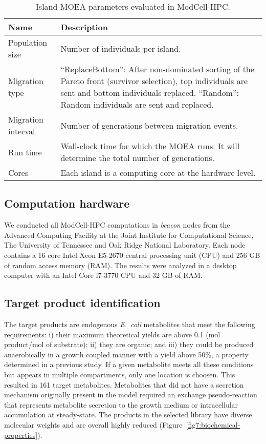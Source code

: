{\begin{table}[h]
    \caption{Island-MOEA parameters evaluated in ModCell-HPC.}
    \centering
    \begin{tabular}{lp{13cm}}
        \toprule
        Name                & Description   \\
        \midrule
        Population size     & Number of individuals per island.  \\
        Migration type      & ``ReplaceBottom'': After non-dominated sorting of the Pareto front\citep{deb2002} (survivor selection), top individuals are sent and bottom individuals replaced. ``Random'': Random individuals are sent and replaced.  \\
        Migration interval  & Number of generations between migration events.    \\
        Run time            & Wall-clock time for which the MOEA runs. It will determine the total number of generations.   \\
        Cores               & Each island is a computing core at the hardware level. \\
        \hline
    \end{tabular}
    \label{tab7:parameters}
\end{table}


\subsection{Computation hardware}
We conducted all ModCell-HPC computations in \emph{beacon} nodes from the Advanced Computing Facility at the Joint Institute for Computational Science, The University of Tennessee and Oak Ridge National Laboratory. Each node contains a 16 core Intel Xeon E5-2670 central processing unit (CPU) and 256 GB of random access memory (RAM). The results were analyzed in a desktop computer with an Intel Core i7-3770 CPU and 32 GB of RAM.

\subsection{Target product identification}
The target products are endogenous \textit{E.~coli} metabolites that meet the following requirements: i) their maximum theoretical yields are above 0.1 (mol product/mol of substrate); ii) they are organic; and iii) they could be produced anaerobically in a growth coupled manner with a yield above 50\%, a property determined in a previous study.\citep{kamp2017}
If a given metabolite meets all these conditions but appears in multiple compartments, only one location is choosen.  %
This resulted in 161 target metabolites.
Metabolites that did not have a secretion mechanism originally present in the model required an exchange pseudo-reaction that represents metabolite secretion to the growth medium or intracellular accumulation at steady-state.
The products in the selected library have diverse molecular weights and are overall highly reduced
(Figure~\ref{fig7:biochemical-properties}).

}

